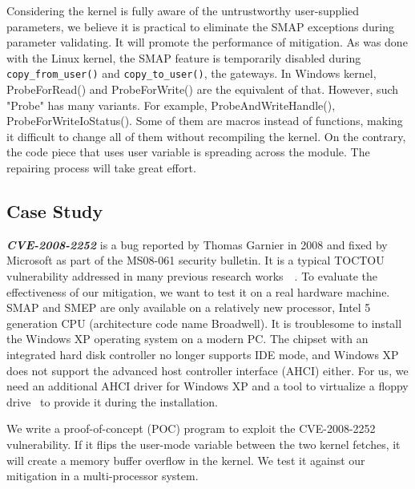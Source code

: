 
Considering the kernel is fully aware of the untrustworthy user-supplied parameters, we believe it is practical to eliminate the SMAP exceptions during parameter validating. It will promote the performance of mitigation. As was done with the Linux kernel, the SMAP feature is temporarily disabled during \texttt{copy\_from\_user()} and \texttt{copy\_to\_user()}, the gateways. In Windows kernel, ProbeForRead() and ProbeForWrite() are the equivalent of that. However, such "Probe" has many variants. For example, ProbeAndWriteHandle(), ProbeForWriteIoStatus(). Some of them are macros instead of functions, making it difficult to change all of them without recompiling the kernel. On the contrary, the code piece that uses user variable is spreading across the module. The repairing process will take great effort. 

\subsection{Case Study}


\textbf{\textit{CVE-2008-2252}} is a bug reported by Thomas Garnier in 2008 and fixed by Microsoft as part of the MS08-061 security bulletin.  It is a typical TOCTOU vulnerability addressed in many previous research works~\cite{wang2019dftracker}~\cite{jurczyk2013identifying}. To evaluate the effectiveness of our mitigation, we want to test it on a real hardware machine. SMAP and SMEP are only available on a relatively new processor, Intel 5 generation CPU (architecture code name Broadwell). It is troublesome to install the Windows XP operating system on a modern PC. The chipset with an integrated hard disk controller no longer supports IDE mode, and Windows XP does not support the advanced host controller interface (AHCI) either. For us, we need an additional AHCI driver for Windows XP and a tool to virtualize a floppy drive~\cite{installxpskylake} to provide it during the installation.

We write a proof-of-concept (POC) program to exploit the CVE-2008-2252 vulnerability. If it flips the user-mode variable between the two kernel fetches, it will create a memory buffer overflow in the kernel. We test it against our mitigation in a multi-processor system.



